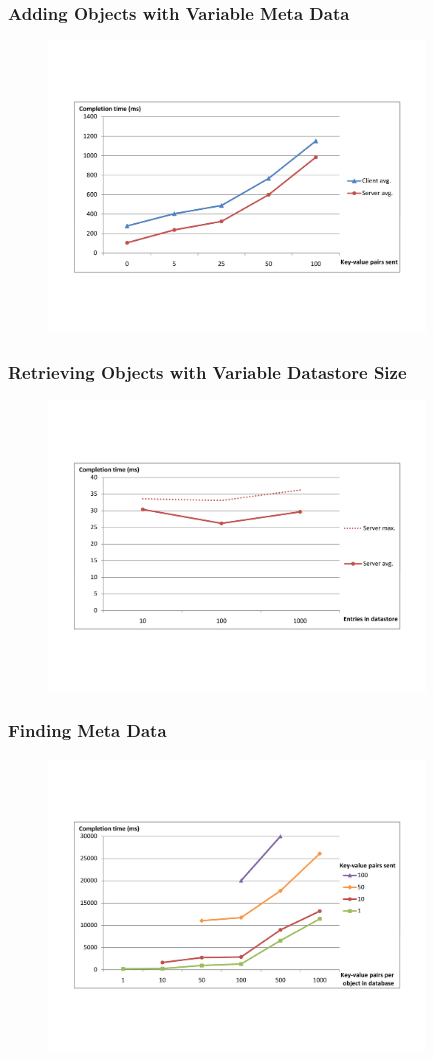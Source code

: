 \documentclass{beamer}
\begin{document}
\frame
{
	\frametitle{Adding Objects with Variable Meta Data}
	\begin{figure}[t]
	\begin{center}
	\includegraphics[trim=4cm 4cm 4cm 5cm, width=10cm]{add_md.pdf} 
	\end{center}
	\end{figure}
}

\frame
{
	\frametitle{Retrieving Objects with Variable Datastore Size}
	\begin{figure}[t]
	\begin{center}
	\includegraphics[trim=4cm 4cm 4cm 5cm, width=10cm]{get_amt.pdf} 
	\end{center}
	\end{figure}
}

\frame
{
	\frametitle{Finding Meta Data}
	\begin{figure}[t]
	\begin{center}
	\includegraphics[trim=4cm 4cm 4cm 5cm, width=10cm]{find_amt.pdf} 
	\end{center}
	\end{figure}
}
\end{document}
